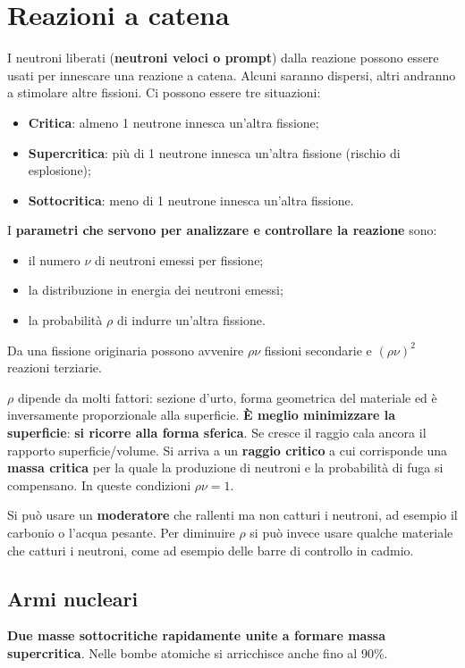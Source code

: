\documentclass[a4paper,11pt,twoside,openany]{book}
\theoremstyle{definition}
\theoremstyle{plain}
\theoremstyle{plain}
\theoremstyle{definition}
\begin{document}
\section{Reazioni a catena} %
I neutroni liberati (\textbf{neutroni veloci o prompt}) dalla reazione possono essere usati per innescare una reazione a catena. Alcuni saranno dispersi, altri andranno a stimolare altre fissioni. Ci possono essere tre situazioni:
\begin{itemize}
\item \textbf{Critica}: almeno 1 neutrone innesca un'altra fissione;
\item \textbf{Supercritica}: più di 1 neutrone innesca un'altra fissione (rischio di esplosione);
\item \textbf{Sottocritica}: meno di 1 neutrone innesca un'altra fissione.
\end{itemize}

I \textbf{parametri che servono per analizzare e controllare la reazione} sono:
\begin{itemize}
\item il numero $\nu$ di neutroni emessi per fissione;
\item la distribuzione in energia dei neutroni emessi;
\item la probabilità $\rho$ di indurre un'altra fissione.
\end{itemize}
Da una fissione originaria possono avvenire $\rho\nu$ fissioni secondarie e $\left(\rho\nu\right)^2$ reazioni terziarie. 

$\rho$ dipende da molti fattori: sezione d'urto, forma geometrica del materiale ed è inversamente proporzionale alla superficie. \textbf{È meglio minimizzare la superficie}: \textbf{si ricorre alla forma sferica}. Se cresce il raggio cala ancora il rapporto superficie/volume. Si arriva a un \textbf{raggio critico} a cui corrisponde una \textbf{massa critica} per la quale la produzione di neutroni e la probabilità di fuga si compensano. In queste condizioni $\rho\nu=1$.

Si può usare un \textbf{moderatore} che rallenti ma non catturi i neutroni, ad esempio il carbonio o l'acqua pesante. Per diminuire $\rho$ si può invece usare qualche materiale che catturi i neutroni, come ad esempio delle barre di controllo in cadmio.

\subsection{Armi nucleari} %
\textbf{Due masse sottocritiche rapidamente unite a formare massa supercritica}. Nelle bombe atomiche si arricchisce anche fino al 90\%.
\end{document}
